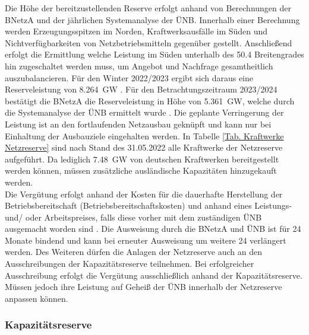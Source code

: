 			Die Höhe der bereitzustellenden Reserve erfolgt anhand von Berechnungen der BNetzA und der jährlichen Systemanalyse der ÜNB.
			Innerhalb einer Berechnung werden Erzeugungsspitzen im Norden, Kraftwerksausfälle im Süden und Nichtverfügbarkeiten von Netzbetriebsmitteln gegenüber gestellt.
			Anschließend erfolgt die Ermittlung welche Leistung im Süden unterhalb des \num{50,4} Breitengrades hin zugeschaltet werden muss, um Angebot und Nachfrage gesamtheitlich auszubalancieren.
			Für den Winter 2022/2023 ergibt sich daraus eine Reserveleistung von \SI{8,264}{\giga\watt} \cite{Bedarf_Netz_Kapa_Reserve}.
			Für den Betrachtungszeitraum 2023/2024 bestätigt die BNetzA die Reserveleistung in Höhe von \SI{5,361}{\giga\watt}, welche durch die Systemanalyse der ÜNB ermittelt wurde \cite{Bedarf_Netz_Kapa_Reserve}.		
			Die geplante Verringerung der Leistung ist an den fortlaufenden Netzausbau geknüpft und kann nur bei Einhaltung der Ausbauziele eingehalten werden. 
			In Tabelle \ref{Tab. Kraftwerke Netzreserve} sind nach Stand des 31.05.2022 alle Kraftwerke der Netzreserve aufgeführt. 
			Da lediglich \SI{7,48}{\giga\watt} von deutschen Kraftwerken bereitgestellt werden können, müssen zusätzliche ausländische Kapazitäten hinzugekauft werden. \\		
			
			Die Vergütung erfolgt anhand der Kosten für die dauerhafte Herstellung der Betriebsbereitschaft (Betriebsbereitschaftskosten) und anhand eines Leistungs- und/ oder Arbeitspreises, falls diese vorher mit dem zuständigen ÜNB ausgemacht worden sind \cite{EnWG}.
			Die Ausweisung durch die BNetzA und ÜNB ist für 24 Monate bindend und kann bei erneuter Ausweisung um weitere 24 verlängert werden.		
			Des Weiteren dürfen die Anlagen der Netzreserve auch an den Ausschreibungen der Kapazitätsreserve teilnehmen.
			Bei erfolgreicher Ausschreibung erfolgt die Vergütung ausschließlich anhand der Kapazitätsreserve.
			Müssen jedoch ihre Leistung auf Geheiß der ÜNB innerhalb der Netzreserve anpassen können.
		    
		\subsubsection{Kapazitätsreserve}
		
